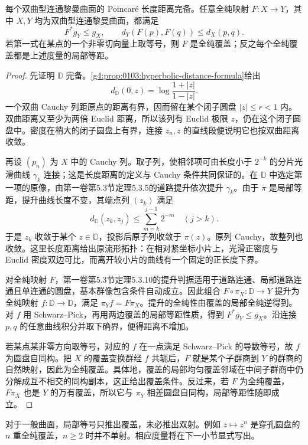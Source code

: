 \begin{theorem}
	\label{g4:thm:0504:poincare-complete}
	每个双曲型连通黎曼曲面的 Poincaré 长度距离完备。任意全纯映射 \(F:X\to Y\)，其中 \(X,Y\) 均为双曲型连通黎曼曲面，都满足
	\[
		F^*g_Y\le g_X,
		\qquad d_Y(F(p),F(q))\le d_X(p,q).
	\]
	若第一式在某点的一个非零切向量上取等号，则 \(F\) 是全纯覆盖；反之每个全纯覆盖都是上述度量的局部等距。
\end{theorem}
\begin{proof}
	先证明 \(\mathbb D\) 完备。\cref{g4:prop:0103:hyperbolic-distance-formula}给出
	\[
		d_{\mathbb D}(0,z)=\log\frac{1+|z|}{1-|z|}.
	\]
	一个双曲 Cauchy 列距原点的距离有界，因而留在某个闭子圆盘 \(|z|\le r<1\) 内。双曲距离又至少为两倍 Euclid 距离，所以该列有 Euclid 极限 \(z\)，仍在这个闭子圆盘中。密度在稍大的闭子圆盘上有界，连接 \(z_n,z\) 的直线段便说明它也按双曲距离收敛。

	再设 \((p_n)\) 为 \(X\) 中的 Cauchy 列。取子列，使相邻项可由长度小于 \(2^{-k}\) 的分片光滑曲线 \(\gamma_k\) 连接；这是长度距离的定义与 Cauchy 条件共同保证的。在 \(\mathbb D\) 中选定第一项的原像，由第一卷第5.3节定理5.3.5的道路提升依次提升 \(\gamma_k\)。由于 \(\pi\) 是局部等距，提升曲线长度不变，其端点列 \((z_k)\) 满足
	\[
		d_{\mathbb D}(z_k,z_j)\le\sum_{m=k}^{j-1}2^{-m}\quad(j>k).
	\]
	于是 \(z_k\) 收敛于某个 \(z\in\mathbb D\)，投影后原子列收敛于 \(\pi(z)\)。原列 Cauchy，故整列也收敛。这里长度距离给出原流形拓扑：在相对紧坐标小片上，光滑正密度与 Euclid 密度双边可比，而离开较小片的曲线有一个固定的正长度下界。

	对全纯映射 \(F\)，第一卷第5.3节定理5.3.10的提升判据适用于道路连通、局部道路连通且单连通的圆盘，基本群像包含条件自动成立。因此组合 \(F\circ\pi_X:\mathbb D\to Y\) 提升为全纯映射 \(f:\mathbb D\to\mathbb D\)，满足 \(\pi_Yf=F\pi_X\)。提升的全纯性由覆盖的局部全纯逆得到。对 \(f\) 用 Schwarz--Pick，再用两边覆盖的局部等距性质，得到 \(F^*g_Y\le g_X\)。沿连接 \(p,q\) 的任意曲线积分并取下确界，便得距离不增加。

	若某点某非零方向取等号，对应的 \(f\) 在一点满足 Schwarz--Pick 的导数等号，故 \(f\) 为圆盘自同构。把 \(X\) 的覆盖变换群经 \(f\) 共轭后，\(F\) 就是某个子群商到 \(Y\) 的群商的自然映射，因此为全纯覆盖。具体地，覆盖的局部均匀覆盖邻域在中间子群商中仍分解成互不相交的同构副本，这正给出覆盖条件。反过来，若 \(F\) 为全纯覆盖，\(F\pi_X\) 也是 \(Y\) 的万有覆盖，所以它与 \(\pi_Y\) 相差圆盘自同构，局部等距性随即成立。
\end{proof}

对于一般曲面，局部等号只推出覆盖，未必推出双射。例如 \(z\mapsto z^n\) 是穿孔圆盘的 \(n\) 重全纯覆盖，\(n\ge2\) 时并不单射。相应度量将在下一小节显式写出。

